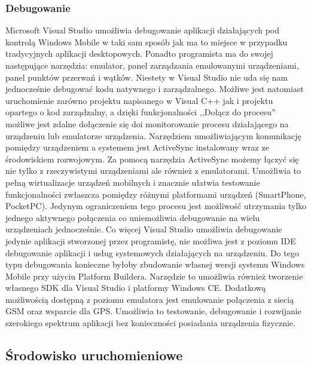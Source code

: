 \subsubsection{Debugowanie}
Microsoft Visual Studio umożliwia debugowanie aplikacji działających pod
kontrolą Windows Mobile w taki sam sposób jak ma to miejsce w przypadku
tradycyjnych aplikacji desktopowych. Ponadto programista ma do swojej
następujące narzędzia: emulator, panel zarządzania emulowanymi urządzeniami,
panel punktów przerwań i wątków. Niestety w Visual Studio nie uda się nam
jednocześnie debugować kodu natywnego i zarządzalnego. Możliwe jest natomiast
uruchomienie zarówno projektu napisanego w Visual C++ jak i projektu opartego o
kod zarządzalny, a dzięki funkcjonalności ,,Dołącz do procesu'' możliwe jest
zdalne dołączenie się doi monitorowanie procesu działającego na urządzeniu lub
emulatorze urządzenia. Narzędziem umożliwiającym komunikację pomiędzy
urządzeniem a systemem jest ActiveSync instalowany wraz ze środowiskiem
rozwojowym.  Za pomocą narzędzia ActiveSync możemy łączyć się nie tylko z
rzeczywistymi urządzeniami ale również z emulatorami. Umożliwia to pełną
wirtualizacje urządzeń mobilnych i znacznie ułatwia testowanie funkcjonalności
zwłaszcza pomiędzy różnymi platformami urządzeń (SmartPhone, PocketPC). Jedynym
ograniczeniem tego procesu jest możliwość utrzymania tylko jednego aktywnego
połączenia co uniemożliwia debugowanie na wielu urządzeniach jednocześnie. Co
więcej Visual Studio umożliwia debugowanie jedynie aplikacji stworzonej przez
programistę, nie możliwa jest z poziomu IDE debugowanie aplikacji i usług
systemowych działających na urządzeniu. Do tego typu debugowania konieczne
byłoby zbudowanie własnej wersji systemu Windows Mobile przy użyciu Platform
Buildera. Narzędzie to umożliwia również tworzenie własnego SDK dla Visual
Studio i platformy Windows CE. Dodatkową możliwością dostępną z poziomu
emulatora jest emulowanie połączenia z siecią GSM oraz wsparcie dla GPS.
Umożliwia to testowanie, debugowanie i rozwijanie szerokiego spektrum aplikacji
bez konieczności posiadania urządzenia fizycznie.

\subsection{Środowisko uruchomieniowe}